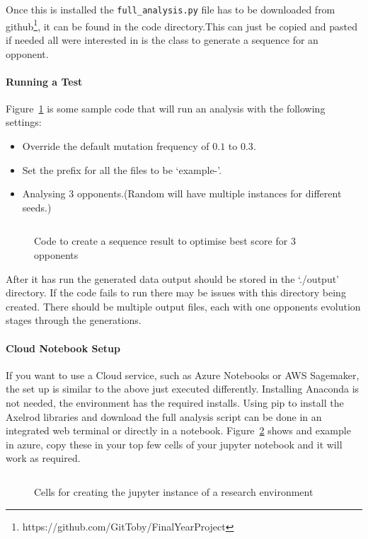 Once this is installed the \texttt{full\_analysis.py} file has to be downloaded from github\footnote{https://github.com/GitToby/FinalYearProject}, it can be found in the code directory.This can just be copied and pasted if needed all were interested in is the class to generate a sequence for an opponent.

\paragraph{Running a Test}
Figure~\ref{code:analysisExample} is some sample code that will run an analysis with the following settings:
\begin{itemize}
    \item Override the default mutation frequency of \(0.1\) to \(0.3\).
    \item Set the prefix for all the files to be `example-'.
    \item Analysing 3 opponents.(Random will have multiple instances for different seeds.) 
\end{itemize}
\begin{figure}[ht]
    \centering
    \inputminted{python}{code_snippets/analysisExample.py}
    \caption{Code to create a sequence result to optimise best score for 3 opponents}\label{code:analysisExample}
\end{figure}

After it has run the generated data output should be stored in the `./output' directory.
If the code fails to run there may be issues with this directory being created.
There should be multiple output files, each with one opponents evolution stages through the generations.

\paragraph{Cloud Notebook Setup} 
If you want to use a Cloud service, such as Azure Notebooks or AWS Sagemaker, the set up is similar to the above just executed differently.
Installing Anaconda is not needed, the environment has the required installs.
Using pip to install the Axelrod libraries and download the full analysis script can be done in an integrated web terminal or directly in a notebook.
Figure~\ref{code:jupyterExample} shows and example in azure, copy these in your top few cells of your jupyter notebook and it will work as required.

\begin{figure}[ht]
    \inputminted{python}{code_snippets/dev-examples/jupyterCells.py}
    \caption{Cells for creating the jupyter instance of a research environment}\label{code:jupyterExample}
\end{figure}

